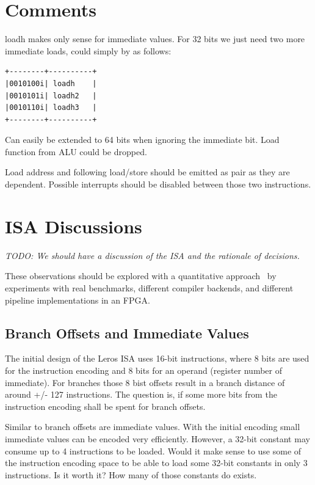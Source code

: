 \documentclass[a4paper,fontsize=10pt,twoside,DIV15,BCOR12mm,headinclude=true,footinclude=false,pagesize,bibtotoc]{scrbook}
\newcommand{\todo}[1]{{\emph{TODO: #1}}}
\begin{document}
\section{Comments}

loadh makes only sense for immediate values. For 32 bits we just need two more immediate loads, could simply by as follows:

\begin{verbatim}
+--------+----------+
|0010100i| loadh    |
|0010101i| loadh2   |
|0010110i| loadh3   |
+--------+----------+
\end{verbatim}

Can easily be extended to 64 bits when ignoring the immediate bit. Load function from ALU could be dropped.

Load address and following load/store should be emitted as pair as they are dependent. Possible interrupts should be disabled between those two instructions.

\section{ISA Discussions}

\todo{We should have a discussion of the ISA and the rationale of decisions.}

These observations should be explored with a quantitative approach~\cite{H and P} by experiments
with real benchmarks, different compiler backends, and different pipeline implementations in
an FPGA.

\subsection{Branch Offsets and Immediate Values}

The initial design of the Leros ISA uses 16-bit instructions, where 8 bits are used for the
instruction encoding and 8 bits for an operand (register number of immediate). For branches
those 8 bist offsets result in a branch distance of around +/- 127 instructions.
The question is, if some more bits from the instruction encoding shall be spent for
branch offsets.



Similar to branch offsets are immediate values. With the initial encoding small immediate
values can be encoded very efficiently. However, a 32-bit constant may consume up to 4
instructions to be loaded. Would it make sense to use some of the instruction encoding space
to be able to load some 32-bit constants in only 3 instructions. Is it worth it? How many of those
constants do exists.
\end{document}
